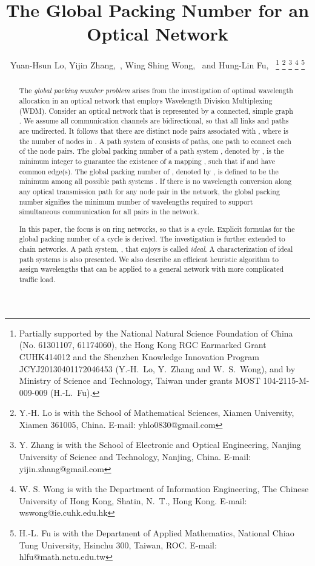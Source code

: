 \documentclass[journal,draftcls,onecolumn,12pt,twoside]{IEEEtran}
\begin{document}
\title{The Global Packing Number for an Optical Network}

\author{Yuan-Hsun Lo, Yijin Zhang,~, Wing Shing Wong,~ and Hung-Lin Fu,~
\thanks{Partially supported by the National Natural Science Foundation of China (No. 61301107, 61174060), the Hong Kong RGC Earmarked Grant CUHK414012 and the Shenzhen Knowledge Innovation Program JCYJ20130401172046453 (Y.-H.~Lo, Y.~Zhang and W.~S.~Wong), and by Ministry of Science and Technology, Taiwan under grants MOST 104-2115-M-009-009 (H.-L.~Fu).}
\thanks{Y.-H. Lo is with the School of Mathematical Sciences, Xiamen University, Xiamen 361005, China. E-mail: yhlo0830@gmail.com}
\thanks{Y. Zhang is with the School of Electronic and Optical Engineering, Nanjing University of Science and Technology, Nanjing, China.
E-mail: yijin.zhang@gmail.com}
\thanks{W. S. Wong is with the Department of Information Engineering, The Chinese University of Hong Kong, Shatin, N.~T., Hong Kong.
E-mail: wswong@ie.cuhk.edu.hk}
\thanks{H.-L. Fu is with the Department of Applied Mathematics, National Chiao Tung University, Hsinchu 300, Taiwan, ROC. E-mail: hlfu@math.nctu.edu.tw}
}
\maketitle


\begin{abstract}
The {\em global packing number problem} arises from the investigation of optimal wavelength allocation in an optical network that employs Wavelength Division Multiplexing (WDM).
Consider an optical network that is represented by a connected, simple graph . 
We assume all communication channels are bidirectional, so that all links and paths
are undirected.
It follows that there are  distinct node pairs associated with ,
where  is the number of nodes in .
A path system  of  consists of  paths, one path to
connect each of the node pairs.  The global packing number of a path system , denoted by , is the minimum integer  to guarantee the existence of a mapping , such that  if  and  have common edge(s).
The global packing number of , denoted by , is defined to be the minimum  among all possible path systems .
If there is no wavelength conversion along any optical transmission path for any node pair in the network, the global packing number signifies the minimum number of wavelengths required to support simultaneous communication for all pairs in the network.

In this paper, the focus is on ring networks, so that  is a cycle.
Explicit formulas for the global packing number of a cycle is derived.
The investigation is further extended to chain networks.
A path system, , that enjoys  is called {\em ideal}.  A characterization of ideal path systems is also presented.
We also describe an efficient heuristic algorithm to assign wavelengths that can be applied
to a general network with more complicated traffic load.




\end{abstract}
\end{document}
